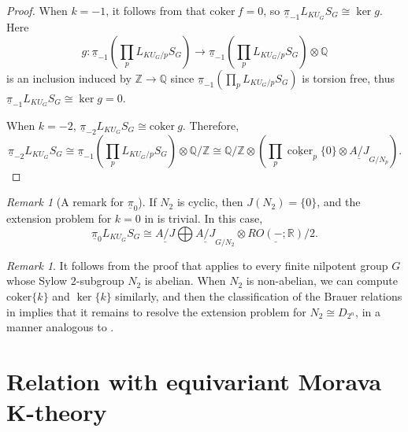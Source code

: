 \documentclass{amsart}
\theoremstyle{plain}
\theoremstyle{definition}
\theoremstyle{remark}
\newtheorem{remark}[theorem]{Remark}
\begin{document}
\begin{proof}
    When $k=-1$, it follows from \cite[Lemma 4.14]{carawan2023homotopy} that $\mathrm{coker} \ f=0$, so $\underline{\pi}_{-1} L_{KU_G}S_G\cong \ker g$. Here 
    \[
    g : \underline{\pi}_{-1}(\prod_{p} L_{KU_G/p} S_G) \to \underline{\pi}_{-1}(\prod_{p} L_{KU_G/p} S_G)\otimes \mathbb{Q}
    \]
    is an inclusion induced by $\mathbb{Z}\to \mathbb{Q}$ since $\underline{\pi}_{-1}(\prod_{p} L_{KU_G/p} S_G)$ is torsion free, thus $\underline{\pi}_{-1} L_{KU_G}S_G\cong \ker g=0$. 

    When $k=-2$, $\underline{\pi}_{-2} L_{KU_G}S_G\cong \mathrm{coker}\ g$. Therefore, 
    \[\underline{\pi}_{-2} L_{KU_G}S_G\cong \underline{\pi}_{-1}(\prod_{p} L_{KU_G/p} S_G)\otimes \mathbb{Q}/\mathbb{Z}\cong \mathbb{Q}/\mathbb{Z} \otimes (\prod_p \underline{\operatorname{coker}}_p\{0\}\otimes \underline{A/J}_{G/N_p}).\]
\end{proof}

\begin{remark}[A remark for $\underline{\pi}_0$]
    If $N_2$ is cyclic, then $J(N_2)=\{0\}$, and the extension problem for $k=0$ in  is trivial. In this case, 
    \[\underline{\pi}_0 L_{KU_G}S_G\cong \underline{A/J}\bigoplus \underline{A/J}_{G/N_2}\otimes \underline{RO(-;\mathbb{R})}/2.\] 
\end{remark}

\begin{remark}\label{rmk: KU_G local for nilpotent G}
    It follows from the proof that  applies to every finite nilpotent group $G$ whose Sylow $2$-subgroup $N_2$ is abelian. When $N_2$ is non-abelian, we can compute $\mathrm{coker}\{k\}$ and $\ker\{k\}$ similarly, and then the classification of the Brauer relations in \cite[Theorem 5.3]{bartel2015brauer} implies that it remains to resolve the extension problem for $N_2\cong D_{2^n}$, in a manner analogous to .
\end{remark}





\section{Relation with equivariant Morava K-theory}\label{Sec:equivariant chromatic}
\end{document}
